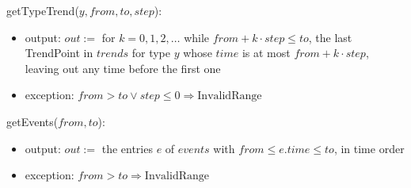 \documentclass[12pt, titlepage]{article}
\begin{document}
\noindent getTypeTrend($y, \mathit{from}, \mathit{to}, \mathit{step}$):
\begin{itemize}
\item output: $\mathit{out} :=$ for $k = 0, 1, 2, \ldots$ while
  $\mathit{from} + k \cdot \mathit{step} \leq \mathit{to}$, the last
  TrendPoint in $\mathit{trends}$ for type $y$ whose $\mathit{time}$ is at
  most $\mathit{from} + k \cdot \mathit{step}$, leaving out any time before
  the first one
\item exception: $\mathit{from} > \mathit{to} \vee \mathit{step} \leq 0
  \Rightarrow \mathrm{InvalidRange}$
\end{itemize}

\noindent getEvents($\mathit{from}, \mathit{to}$):
\begin{itemize}
\item output: $\mathit{out} :=$ the entries $e$ of $\mathit{events}$ with
  $\mathit{from} \leq e.\mathit{time} \leq \mathit{to}$, in time order
\item exception: $\mathit{from} > \mathit{to} \Rightarrow
  \mathrm{InvalidRange}$
\end{itemize}
\end{document}
